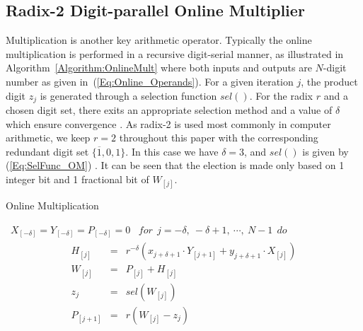 \documentclass{acm_proc_article-sp}
\begin{document}
\subsection{Radix-2 Digit-parallel Online Multiplier}\label{subsec:OnlineMultiplier}
Multiplication is another key arithmetic operator. Typically the online multiplication is performed in a recursive digit-serial manner, as illustrated in Algorithm~\ref{Algorithm:OnlineMult} \cite{Ercegovac_OnlineMult} where both inputs and outputs are $N$-digit number as given in~(\ref{Eq:Online_Operands}). For a given iteration $j$, the product digit $z_j$ is generated through a selection function $sel()$. For the radix $r$ and a chosen digit set, there exits an appropriate selection method and a value of $\delta$ which ensure convergence \cite{Ercegovac_OnlineMult}. As radix-2 is used most commonly in computer arithmetic, we keep $r=2$ throughout this paper with the corresponding redundant digit set $\{\overline{1},0,1\}$. In this case we have $\delta=3$, and $sel()$ is given by (\ref{Eq:SelFunc_OM}) \cite{Oregon_OnlineNetwork}. It can be seen that the election is made only based on 1 integer bit and 1 fractional bit of $W_{[j]}$.

\begin{algorithm}[tbp]
  \caption{Online Multiplication}
  \begin{algorithmic}[1]
    \REQUIRE~$X_{[-\delta]}=Y_{[-\delta]}=P_{[-\delta]}=0$
    \ENSURE~$for~~ j=-\delta,~-\delta+1,~\cdots,~N-1 ~~do$
      \begin{eqnarray}\label{Eq:OnlineMult_General}
        \begin{matrix}
          H_{[j]}   & = & r^{-\delta}\left(x_{j+\delta+1}\cdot Y_{[j+1]}+y_{j+\delta+1}\cdot X_{[j]}\right)\\
          W_{[j]}   & = & P_{[j]} + H_{[j]}\\
          z_j       & = & sel(W_{[j]})\\
          P_{[j+1]} & = & r\left(W_{[j]}-z_j\right)
        \end{matrix}
      \end{eqnarray}
  \label{Algorithm:OnlineMult}
  \vspace{-2ex}
  \end{algorithmic}
\end{algorithm}
\vspace{-2ex}
\end{document}
